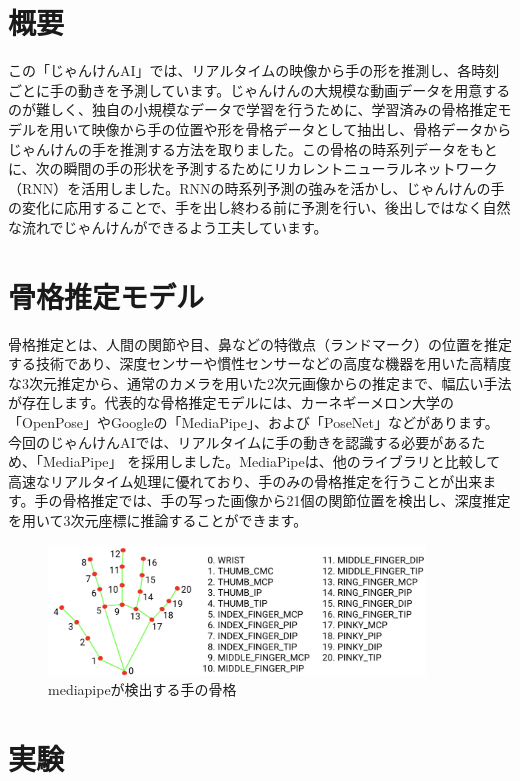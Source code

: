 \section{概要}
この「じゃんけんAI」では、リアルタイムの映像から手の形を推測し、各時刻ごとに手の動きを予測しています。じゃんけんの大規模な動画データを用意するのが難しく、独自の小規模なデータで学習を行うために、学習済みの骨格推定モデルを用いて映像から手の位置や形を骨格データとして抽出し、骨格データからじゃんけんの手を推測する方法を取りました。この骨格の時系列データをもとに、次の瞬間の手の形状を予測するためにリカレントニューラルネットワーク（RNN）を活用しました。RNNの時系列予測の強みを活かし、じゃんけんの手の変化に応用することで、手を出し終わる前に予測を行い、後出しではなく自然な流れでじゃんけんができるよう工夫しています。

\section{骨格推定モデル}
骨格推定とは、人間の関節や目、鼻などの特徴点（ランドマーク）の位置を推定する技術であり、深度センサーや慣性センサーなどの高度な機器を用いた高精度な3次元推定から、通常のカメラを用いた2次元画像からの推定まで、幅広い手法が存在します。代表的な骨格推定モデルには、カーネギーメロン大学の「OpenPose\cite{cao2019openposerealtimemultiperson2d}」やGoogleの「MediaPipe\cite{mediapipe}」、および「PoseNet\cite{kendall2016posenetconvolutionalnetworkrealtime}」などがあります。今回のじゃんけんAIでは、リアルタイムに手の動きを認識する必要があるため、「MediaPipe」 を採用しました。MediaPipeは、他のライブラリと比較して高速なリアルタイム処理に優れており、手のみの骨格推定を行うことが出来ます。手の骨格推定では、手の写った画像から21個の関節位置を検出し、深度推定を用いて3次元座標に推論することができます。
\begin{figure}[h]
  \centering
  \includegraphics[width=10cm]{no-lose-janken/fig/hand-landmarks.png}
  \caption{mediapipeが検出する手の骨格\cite{mediapipe}}
  \label{fig:hand_landmark}
\end{figure}

\section{実験}
